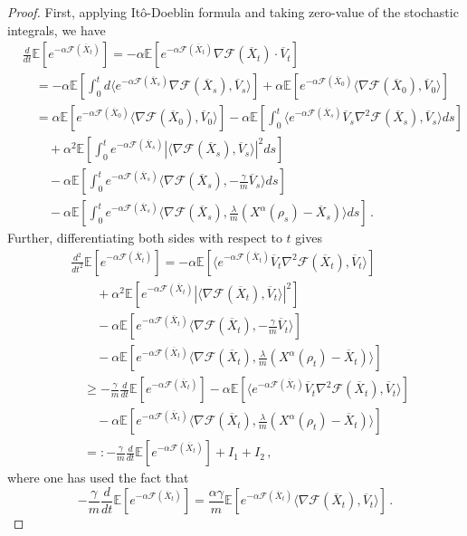 \documentclass{ims9x6}
\newcommand{\nn}{\nonumber}
\newcommand{\EE}{\mathbb{E}}
\newcommand{\TE}{\mathcal{F}}
\newcommand{\OV}{\overline{V}}
\newcommand{\OX}{\overline{X}}
\newcommand{\la}{\langle}
\newcommand{\ra}{\rangle}
\begin{document}
\begin{proof}
	First, applying It\^{o}-Doeblin formula and taking zero-value of the stochastic integrals, we have
	\begin{align*}
	&\frac{d}{dt}\EE[e^{-\alpha\TE(\OX_t)}]=-\alpha \EE [e^{-\alpha\TE(\OX_t)}\nabla \TE(\OX_t)\cdot \OV_t ]\nn\\
	&\quad = -\alpha \EE [ \int_0^t d \la e^{-\alpha\TE(\OX_s)}\nabla \TE(\OX_s), \OV_s \ra ]+\alpha \EE [ e^{-\alpha\TE(\OX_0)}\la  \nabla \TE(\OX_0), \OV_0 \ra ] \\
	&\quad = \alpha \EE [e^{-\alpha\TE(\OX_0)}  \la \nabla \TE(\OX_0), \OV_0 \ra ]-\alpha \EE [ \int_0^t  \la  e^{-\alpha\TE(\OX_s)}\OV_s\nabla^2 \TE(\OX_s), \OV_s \ra  ds]\\
	&\qquad +\alpha^2 \EE [ \int_0^t e^{-\alpha\TE(\OX_s)} |\la \nabla \TE(\OX_s), \OV_s \ra|^2ds ]\\
	&\qquad-\alpha \EE [ \int_0^t e^{-\alpha\TE(\OX_s)} \la \nabla \TE(\OX_s), -\frac{\gamma}{m}\OV_s \ra ds]\\
	&\qquad-\alpha \EE [ \int_0^t e^{-\alpha\TE(\OX_s)} \la \nabla \TE(\OX_s), \frac{\lambda}{m}(X^\alpha(\rho_s)-\OX_s) \ra ds]\,.
	\end{align*}
	Further, differentiating both sides with respect to $t$ gives
	\begin{align}
	&\frac{d^2}{dt^2}\EE[e^{-\alpha\TE(\OX_t)}]=-\alpha \EE [ \la  e^{-\alpha\TE(\OX_t)}\OV_t\nabla^2 \TE(\OX_t), \OV_t \ra ]\nn\\
	&\qquad +\alpha^2 \EE [ e^{-\alpha\TE(\OX_t)} |\la \nabla \TE(\OX_t), \OV_t \ra|^2]\nn\\
	&\qquad -\alpha \EE [  e^{-\alpha\TE(\OX_t)} \la \nabla \TE(\OX_t), -\frac{\gamma}{m}\OV_t \ra ]\nn\\
	&\qquad-\alpha \EE [ e^{-\alpha\TE(\OX_t)} \la \nabla \TE(\OX_t), \frac{\lambda}{m}(X^\alpha(\rho_t)-\OX_t) \ra ] \nn\\
	&\quad \geq -\frac{\gamma}{m} \frac{d}{dt}\EE[e^{-\alpha\TE(\OX_t)}]-\alpha \EE [ \la  e^{-\alpha\TE(\OX_t)}\OV_t\nabla^2 \TE(\OX_t), \OV_t \ra ]\nn\\
	&\qquad -\alpha \EE [ e^{-\alpha\TE(\OX_t)} \la \nabla \TE(\OX_t), \frac{\lambda}{m}(X^\alpha(\rho_t)-\OX_t) \ra ] \nn\\
	&\quad =:-\frac{\gamma}{m} \frac{d}{dt}\EE[e^{-\alpha\TE(\OX_t)}]+I_1+I_2\,,
	\end{align}
	where one has used the fact that
	\begin{equation}
	-\frac{\gamma}{m} \frac{d}{dt}\EE[e^{-\alpha\TE(\OX_t)}]=\frac{\alpha\gamma}{m}\EE [  e^{-\alpha\TE(\OX_t)} \la \nabla \TE(\OX_t), \OV_t \ra ]\,.

\end{equation}
\end{proof}
\end{document}
